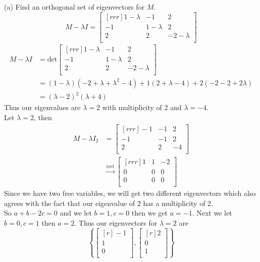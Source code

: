\documentclass[12pt]{article}
\theoremstyle{definition}
\theoremstyle{plain}
\begin{document}
(a) Find an orthogonal set of eigenvectors for $M$.
\[ M-\lambda I = \begin{bmatrix}[rrr]1-\lambda&-1&2\\-1&1-\lambda&2\\2&2&-2-\lambda\\\end{bmatrix} \]
\begin{align*}
M-\lambda I &= \mathrm{det}\begin{bmatrix}[rrr]1-\lambda&-1&2\\-1&1-\lambda&2\\2&2&-2-\lambda\\\end{bmatrix}\\
&= (1-\lambda)(-2+\lambda+\lambda^2-4) +1(2+\lambda - 4) + 2(-2-2+2\lambda)\\
&= (\lambda-2)^2(\lambda+4)
\end{align*}
Thus our eigenvalues are $\lambda=2$ with multiplicity of 2 and $\lambda=-4$.\\
Let $\lambda=2$, then
\begin{align*}
M - \lambda I_2 &= \begin{bmatrix}[rrr]-1&-1&2\\-1&-1&2\\2&2&-4\\\end{bmatrix}\\
&\xrightarrow[]{\mathrm{rref}} \begin{bmatrix}[rrr]1&1&-2\\0&0&0\\0&0&0\\\end{bmatrix}
\end{align*}
Since we have two free variables, we will get two different eigenvectors which also agrees with the fact that our eigenvalue of 2 has a multiplicity of 2.\\
So $a+b-2c=0$ and we let $b=1,c=0$ then we get $a=-1$. Next we let $b=0,c=1$ then $a=2$. Thus our eigenvectors for $\lambda=2$ are
\[ \left \{ \begin{bmatrix}[r]-1\\1\\0\\\end{bmatrix},\begin{bmatrix}[r]2\\0\\1\\\end{bmatrix} \right \} \]
\end{document}
